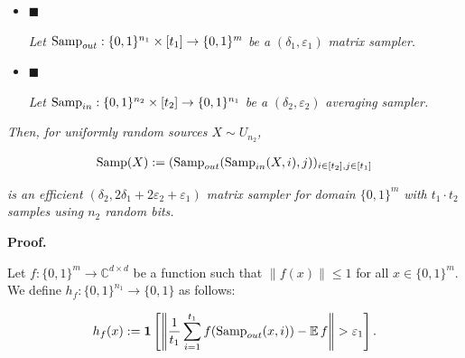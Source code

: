 \documentclass[10pt,a4paper]{article}
\begin{document}
\begin{itemize}


\item[] 
$\blacksquare$ 


\emph{Let }$\textup{{Samp}}_{out}:\{0,1\}^{n_{1}}\times[t_{1}]\to\{0,1\}^{m}$\emph{ be a }$(\delta_{1},\varepsilon_{1})$\emph{ matrix sampler.}\par





\item[] 
$\blacksquare$ 


\emph{Let }$\textup{{Samp}}_{in}:\{0,1\}^{n_{2}}\times[t_{2}]\to\{0,1\}^{n_{1}}$\emph{ be a }$(\delta_{2},\varepsilon_{2})$\emph{ }\emph{averaging}\emph{ sampler.}\par





\end{itemize}


\emph{Then, for uniformly random sources $X\sim U_{n_{2}}$,}\par


\[\begin{gathered}
\textup{{Samp}}(X):=(\textup{{Samp}}_{out}(\textup{{Samp}}_{in}(X,i),j))_{i\in[t_{2}],j\in[t_{1}]}
\end{gathered}\]


\emph{is an efficient $(\delta_{2},2\delta_{1}+2\varepsilon_{2}+\varepsilon_{1})$ matrix sampler for domain $\{0,1\}^{m}$ with $t_{1}\cdot t_{2}$ samples using $n_{2}$ random bits.}\par







\par\medskip\noindent\textbf{Proof.}\par




Let $f:\{0,1\}^{m}\to\mathbb{C}^{d\times d}$ be a function such that $\|f(x)\|\leq 1$ for all $x\in\{0,1\}^{m}$.
We define $h_{f}:\{0,1\}^{n_{1}}\to\{0,1\}$ as follows:\par


\[\begin{gathered}
h_{f}(x):=\mathbf{1}\left[\left\lVert\frac{1}{t_{1}}\sum_{i=1}^{t_{1}}f(\textup{{Samp}}_{out}(x,i))-\operatorname*{\mathbb{E}}f\right\rVert>\varepsilon_{1}\right].
\end{gathered}\]
\end{document}
